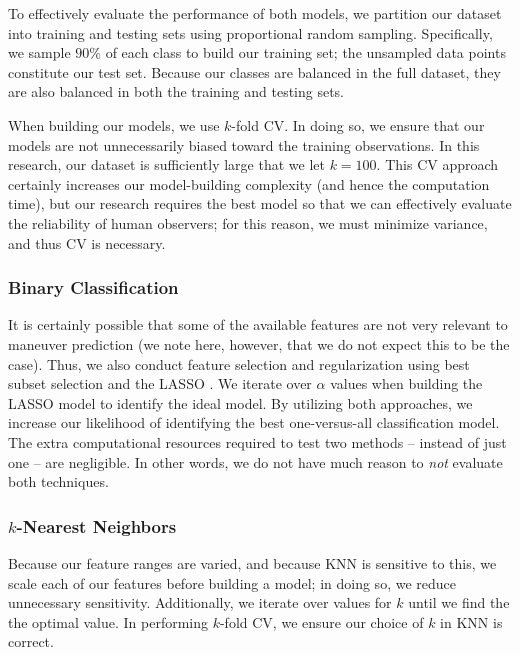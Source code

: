 \documentclass[11pt]{article}
\begin{document}

To effectively evaluate the performance of both models, we partition our dataset into training and testing sets using proportional random sampling. Specifically, we sample $90\%$ of each class to build our training set; the unsampled data points constitute our test set. Because our classes are balanced in the full dataset, they are also balanced in both the training and testing sets.


When building our models, we use $k$-fold \ac{CV}. In doing so, we ensure that our models are not unnecessarily biased toward the training observations. In this research, our dataset is sufficiently large that we let $k=100$. This \ac{CV} approach certainly increases our model-building complexity (and hence the computation time), but our research requires the best model so that we can effectively evaluate the reliability of human observers; for this reason, we must minimize variance, and thus \ac{CV} is necessary. 


\subsubsection{Binary Classification}

It is certainly possible that some of the available features are not very relevant to maneuver prediction (we note here, however, that we do not expect this to be the case). Thus, we also conduct feature selection and regularization using best subset selection and the \ac{LASSO} \cite{James2013}. We iterate over $\alpha$ values when building the \ac{LASSO} model to identify the ideal model. By utilizing both approaches, we increase our likelihood of identifying the best one-versus-all classification model. The extra computational resources required to test two methods -- instead of just one -- are negligible. In other words, we do not have much reason to \textit{not} evaluate both techniques.

\subsubsection{$k$-Nearest Neighbors}

Because our feature ranges are varied, and because \ac{KNN} is sensitive to this, we scale each of our features before building a model; in doing so, we reduce unnecessary sensitivity. Additionally, we iterate over values for $k$ until we find the the optimal value. In performing $k$-fold \ac{CV}, we ensure our choice of $k$ in \ac{KNN} is correct.
\end{document}
